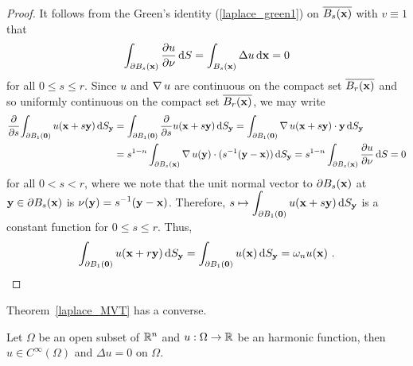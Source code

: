 \begin{proof}
It follows from the Green's identity (\ref{laplace_green1}) on
$\displaystyle \overline{B_s(\VEC{x})}$ with $v \equiv 1$ that
\begin{equation} \label{MVTequ1}
\int_{\partial B_s(\VEC{x})} \pdydx{u}{\VEC{\nu}} \dx{S}
= \int_{B_s(\VEC{x})} \Delta u \dx{\VEC{x}} = 0
\end{equation}
for all $0 \leq s \leq r$.  Since $u$ and
$\graD u$ are continuous on the compact set
$\overline{B_r(\VEC{x})}$ and so uniformly continuous on the compact
set $\overline{B_r(\VEC{x})}$, we may write
\begin{align*}
\pdfdx{ \int_{\partial B_1(\VEC{0})} u(\VEC{x} + s\VEC{y}) \dss{S}{y} }{s}
&= \int_{\partial B_1(\VEC{0})} \pdfdx{u(\VEC{x} + s\VEC{y})}{s} \dss{S}{y}
= \int_{\partial B_1(\VEC{0})} \graD u(\VEC{x} + s\VEC{y}) \cdot
\VEC{y} \dss{S}{y} \\
& = s^{1-n}\int_{\partial B_s(\VEC{x})} \graD u(\VEC{y}) \cdot
(s^{-1}(\VEC{y}-\VEC{x})) \dss{S}{y}
= s^{1-n} \int_{\partial B_s(\VEC{x})}
\pdydx{u}{\VEC{\nu}} \dx{S} = 0
\end{align*}
for all $0<s<r$, where we note that the unit normal vector to
$\partial B_s(\VEC{x})$ at $\VEC{y} \in \partial B_s(\VEC{x})$ is
$\displaystyle \VEC{\nu}(\VEC{y}) = s^{-1}(\VEC{y}-\VEC{x})$.
Therefore,
$\displaystyle s \mapsto
\int_{\partial B_1(\VEC{0})} u(\VEC{x} + s\VEC{y}) \dss{S}{y}$
is a constant function for $0 \leq s \leq r$.  Thus,
\[
\int_{\partial B_1(\VEC{0})} u(\VEC{x} + r\VEC{y}) \dss{S}{y}
= \int_{\partial B_1(\VEC{0})} u(\VEC{x}) \dss{S}{y}
= \omega_n u(\VEC{x}) \ . \qedhere
\]
\end{proof}

Theorem~\ref{laplace_MVT} has a converse.

\begin{theorem} \label{laplace_MVT_conv}
Let $\Omega$ be an open subset of $\RR^n$ and $u:\Omega \rightarrow \RR$
be an harmonic function, then $u \in C^\infty(\Omega)$ and
$\Delta u = 0$ on $\Omega$.
\end{theorem}

